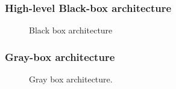 \documentclass[sn-mathphys-num]{sn-jnl}%
\begin{document}
\subsubsection{High-level Black-box architecture}
\begin{figure}[h]
    \caption{Black box architecture}
    \label{fig:gen_arch}
\end{figure}
\subsubsection{Gray-box architecture}
\begin{figure}[h]
    \caption{Gray box architecture.}
    \label{fig:gray_arch}
\end{figure}
\end{document}
